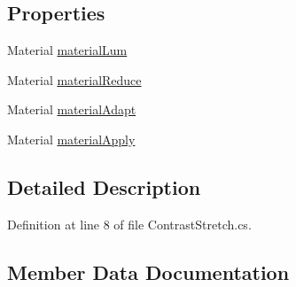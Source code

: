 \subsection*{Properties}
\begin{DoxyCompactItemize}
\item 
Material \mbox{\hyperlink{class_unity_standard_assets_1_1_image_effects_1_1_contrast_stretch_a6b1f80fe7752f251c9cc670f1cfcf3fd}{material\+Lum}}
\item 
Material \mbox{\hyperlink{class_unity_standard_assets_1_1_image_effects_1_1_contrast_stretch_a6772c7ae3b47015455e246e219b32003}{material\+Reduce}}
\item 
Material \mbox{\hyperlink{class_unity_standard_assets_1_1_image_effects_1_1_contrast_stretch_a37b02be4170f3070130887a1f5fc8151}{material\+Adapt}}
\item 
Material \mbox{\hyperlink{class_unity_standard_assets_1_1_image_effects_1_1_contrast_stretch_a8125d5b0c2218a5bbc3366d1b1ab6911}{material\+Apply}}
\end{DoxyCompactItemize}


\subsection{Detailed Description}


Definition at line 8 of file Contrast\+Stretch.\+cs.



\subsection{Member Data Documentation}
\mbox{\label{class_unity_standard_assets_1_1_image_effects_1_1_contrast_stretch_ab81f2962fed7bf78dc6d065d815fc195}} 
